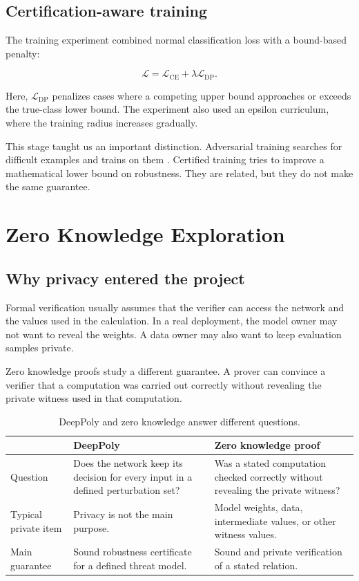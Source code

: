 \documentclass[11pt,a4paper]{report}
\begin{document}
\section{Certification-aware training}

The training experiment combined normal classification loss with a bound-based penalty:

\begin{equation}
\mathcal{L}
=
\mathcal{L}_{\mathrm{CE}}
+
\lambda \mathcal{L}_{\mathrm{DP}}.
\end{equation}

Here, \(\mathcal{L}_{\mathrm{DP}}\) penalizes cases where a competing upper bound approaches or exceeds the true-class lower bound. The experiment also used an epsilon curriculum, where the training radius increases gradually.

This stage taught us an important distinction. Adversarial training searches for difficult examples and trains on them \cite{madry2018towards}. Certified training tries to improve a mathematical lower bound on robustness. They are related, but they do not make the same guarantee.

\chapter{Zero Knowledge Exploration}

\section{Why privacy entered the project}

Formal verification usually assumes that the verifier can access the network and the values used in the calculation. In a real deployment, the model owner may not want to reveal the weights. A data owner may also want to keep evaluation samples private.

Zero knowledge proofs study a different guarantee. A prover can convince a verifier that a computation was carried out correctly without revealing the private witness used in that computation.

\begin{table}[H]
\centering
\caption{DeepPoly and zero knowledge answer different questions.}
\begin{tabularx}{\textwidth}{p{} Y Y}
\toprule
 & \textbf{DeepPoly} & \textbf{Zero knowledge proof} \\
\midrule
Question &
Does the network keep its decision for every input in a defined perturbation set? &
Was a stated computation checked correctly without revealing the private witness? \\
\addlinespace
Typical private item &
Privacy is not the main purpose. &
Model weights, data, intermediate values, or other witness values. \\
\addlinespace
Main guarantee &
Sound robustness certificate for a defined threat model. &
Sound and private verification of a stated relation. \\
\bottomrule
\end{tabularx}
\end{table}
\end{document}
